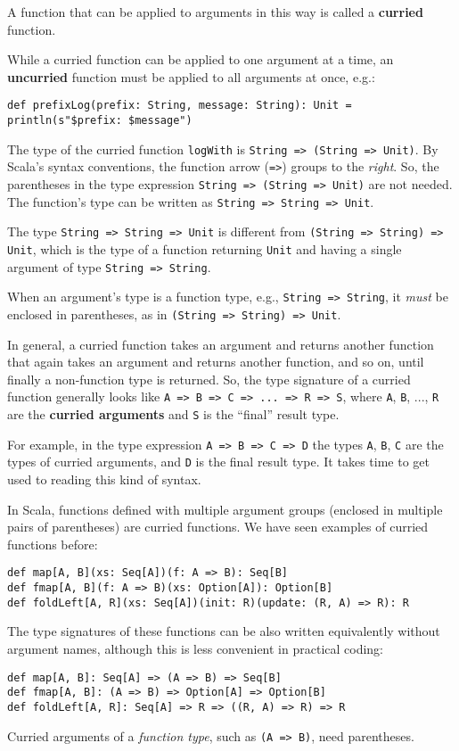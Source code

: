 A function that can be applied to arguments in this way is called
a \textbf{curried} function. 

While a curried function can be applied to one argument at a time,
an \textbf{uncurried} function must be
applied to all arguments at once, e.g.:
\begin{lstlisting}
def prefixLog(prefix: String, message: String): Unit = println(s"$prefix: $message")
\end{lstlisting}

The type of the curried function \lstinline!logWith! is \lstinline!String => (String => Unit)!.
By Scala\textsf{'}s syntax conventions, the function arrow (\lstinline!=>!)
groups to the \emph{right}. So, the parentheses in the type expression
\lstinline!String => (String => Unit)! are not needed. The function\textsf{'}s
type can be written as \lstinline!String => String => Unit!.

The type \lstinline!String => String => Unit! is different from \lstinline!(String => String) => Unit!,
which is the type of a function returning \lstinline!Unit! and having
a single argument of type \lstinline!String => String!. 

When an argument\textsf{'}s type is a function type, e.g., \lstinline!String => String!,
it \emph{must} be enclosed in parentheses, as in \lstinline!(String => String) => Unit!.

In general, a curried function takes an argument and returns another
function that again takes an argument and returns another function,
and so on, until finally a non-function type is returned. So, the
type signature of a curried function generally looks like \lstinline!A => B => C => ... => R => S!,
where \lstinline!A!, \lstinline!B!, ..., \lstinline!R! are the
\textbf{curried arguments} and \lstinline!S!
is the \textsf{``}final\textsf{''} result type.

For example, in the type expression \lstinline!A => B => C => D!
the types \lstinline!A!, \lstinline!B!, \lstinline!C! are the types
of curried arguments, and \lstinline!D! is the final result type.
It takes time to get used to reading this kind of syntax.

In Scala, functions defined with multiple argument groups (enclosed
in multiple pairs of parentheses) are curried functions. We have seen
examples of curried functions before:
\begin{lstlisting}
def map[A, B](xs: Seq[A])(f: A => B): Seq[B]
def fmap[A, B](f: A => B)(xs: Option[A]): Option[B]
def foldLeft[A, R](xs: Seq[A])(init: R)(update: (R, A) => R): R
\end{lstlisting}
The type signatures of these functions can be also written equivalently
without argument names, although this is less convenient in practical
coding:
\begin{lstlisting}
def map[A, B]: Seq[A] => (A => B) => Seq[B]
def fmap[A, B]: (A => B) => Option[A] => Option[B]
def foldLeft[A, R]: Seq[A] => R => ((R, A) => R) => R
\end{lstlisting}
Curried arguments of a \emph{function type}, such as \lstinline!(A => B)!,
need parentheses.

